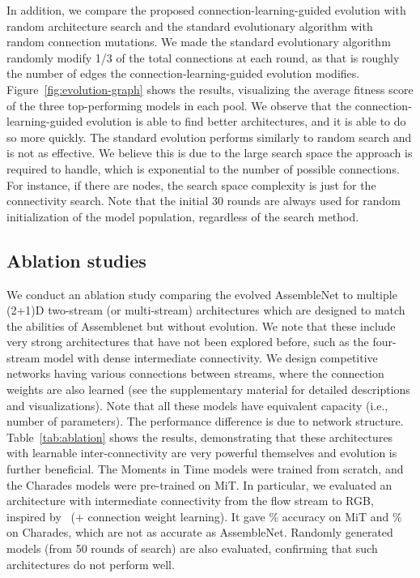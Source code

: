 \documentclass{article} \usepackage{iclr2020_conference,times}
\begin{document}
In addition, we compare the proposed connection-learning-guided evolution with random architecture search and the standard evolutionary algorithm with random connection mutations. We made the standard evolutionary algorithm randomly modify 1/3 of the total connections at each round, as that is roughly the number of edges the connection-learning-guided evolution modifies. 
Figure~\ref{fig:evolution-graph} shows the results, visualizing the average fitness score of the three top-performing models in each pool. We observe that the connection-learning-guided evolution is able to find better architectures, and it is able to do so more quickly. The standard evolution performs similarly to random search and is not as effective. We believe this is due to the large search space the approach is required to handle, which is exponential to the number of possible connections. For instance, if there are  nodes, the search space complexity is  just for the connectivity search. Note that the initial 30 rounds are always used for random initialization of the model population, regardless of the search method.





\vspace{-5pt}
\subsection{Ablation studies}
\vspace{-5pt}

We conduct an ablation study comparing the evolved AssembleNet to multiple (2+1)D two-stream (or multi-stream) architectures which are designed to match the abilities of Assemblenet but without evolution. 
We note that these include very strong architectures that have not been explored before, such as the four-stream model with dense intermediate connectivity. 
We design competitive networks having various connections between streams, where the connection weights are also learned (see the supplementary material for detailed descriptions and visualizations). Note that all these models have equivalent capacity (i.e., number of parameters). The performance difference is due to network structure.
Table~\ref{tab:ablation} shows the results, demonstrating that these architectures with learnable inter-connectivity are very powerful themselves and evolution is further beneficial. The Moments in Time models were trained from scratch, and the Charades models were pre-trained on MiT. In particular, we evaluated an architecture with intermediate connectivity from the flow stream to RGB, inspired by~\cite{feichtenhofer2016convolutional,feichtenhofer2018slowfast} (+ connection weight learning). It gave \% accuracy on MiT and \% on Charades, which are not as accurate as AssembleNet.
Randomly generated models (from 50 rounds of search) are also evaluated, confirming that such architectures do not perform well. 
\end{document}
